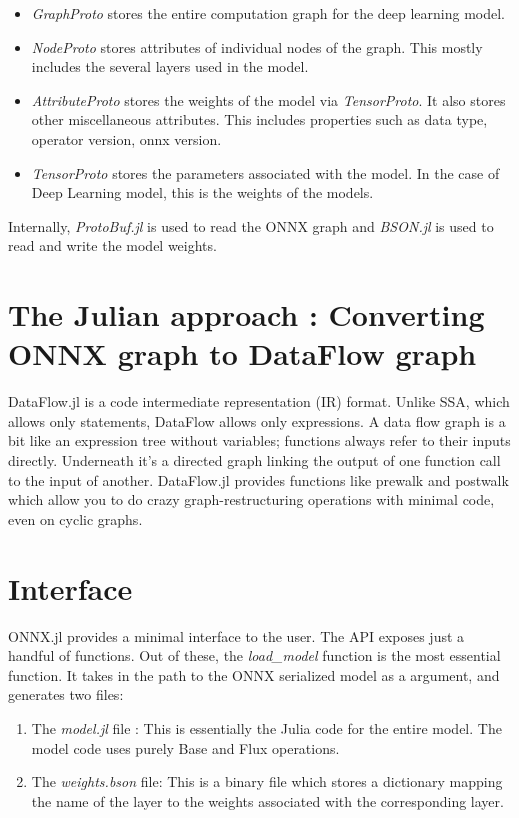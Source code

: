 \documentclass{juliacon}
\begin{document}
\begin{itemize}
    \item \textit{GraphProto} stores the entire computation graph for the deep learning model. \newline
    \item \textit{NodeProto} stores attributes of individual nodes of the graph. This mostly includes the several layers used in the model. \newline
    \item \textit{AttributeProto} stores the weights of the model via \textit{TensorProto}. It also stores other miscellaneous attributes. This includes properties such as data type, operator version, onnx version. \newline
    \item \textit{TensorProto} stores the parameters associated with the model. In the case of Deep Learning model, this is the weights of the models.
\end{itemize}

Internally, \textit{ProtoBuf.jl} is used to read the ONNX graph and \textit{BSON.jl} is used to read and write the model weights.

\section{The Julian approach : Converting ONNX graph to DataFlow graph}

DataFlow.jl is a code intermediate representation (IR) format. Unlike SSA, which allows only statements, DataFlow allows only expressions. A data flow graph is a bit like an expression tree without variables; functions always refer to their inputs directly. Underneath it's a directed graph linking the output of one function call to the input of another. DataFlow.jl provides functions like prewalk and postwalk which allow you to do crazy graph-restructuring operations with minimal code, even on cyclic graphs. 

\section{Interface}
\label{sec:additional_doc}
%
ONNX.jl provides a minimal interface to the user. The API exposes just a handful of functions. Out of these, the \textit{load\_model} function is the most essential function. It takes in the path to the ONNX serialized model as a argument, and generates two files:
\begin{enumerate}
    \item The \textit{model.jl} file : This is essentially the Julia code for the entire model. The model code uses purely Base and Flux operations.
    \item The \textit{weights.bson} file: This is a binary file which stores a dictionary mapping the name of the layer to the weights associated with the corresponding layer.
\end{enumerate}
\end{document}
